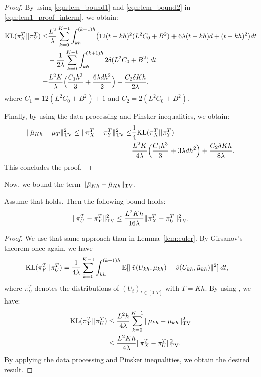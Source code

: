 \begin{proof}
By using \eqref{eqn:lem_bound1} and \eqref{eqn:lem_bound2} in \eqref{eqn:lem1_proof_interm}, we obtain:
\begin{align}
\nonumber \textnormal{KL} (\pi_{X}^T || \pi_{Y}^T) \leq& \frac{L^2}{\lambda} \sum_{k=0}^{K-1} \int_{kh}^{(k+1)h} \bigl(12(t-kh)^2 (L^2 C_0 + B^2) + 6\lambda (t-kh)d +(t-kh)^2 \bigr) dt\\
&+  \frac1{2 \lambda} \sum_{k=0}^{K-1} \int_{kh}^{(k+1)h} 2 \delta(L^2 C_0 + B^2) \> dt \\
=& \frac{L^2 K}{\lambda} \Bigl( \frac{C_1 h^3}{3} + \frac{6 \lambda d h^2}{2} \Bigr) + \frac{C_2 \delta K h}{2\lambda},
\end{align}
where $C_1 = 12(L^2 C_0 + B^2)+1$ and $C_2 = 2 (L^2 C_0 + B^2)$.

Finally, by using the data processing and Pinsker inequalities, we obtain:
\begin{align}
\| \hat{\mu}_{Kh} - \mu_{T} \|_{\textnormal{TV}}^2 \leq \| \pi_{X}^T - \pi_{Y}^T \|_{\textnormal{TV}}^2 \leq& \frac1{4} \textnormal{KL} (\pi_{X}^T || \pi_{Y}^T) \\
=& \frac{L^2 K}{4\lambda} \Bigl( \frac{C_1 h^3}{3} + 3 \lambda d h^2 \Bigr) + \frac{C_2 \delta K h}{8\lambda}.
\end{align}
This concludes the proof.
%
\end{proof}


Now, we bound the term $\| \bar{\mu}_{Kh} - \hat{\mu}_{Kh} \|_{\textnormal{TV}}$.
\begin{lemma}
\label{lem:euler2}
Assume that  holds. Then the following bound holds:
\begin{align}
\| \pi_{U}^T - \pi_{Y}^T \|_{\textnormal{TV}}^2  \leq \frac{L^2 K h}{16 \lambda}  \|\pi_{X}^T - \pi_{U}^T \|_{\textnormal{TV}}^2 .
\end{align}
\end{lemma}
%
\begin{proof}
We use that same approach than in Lemma~\ref{lem:euler}. By Girsanov's theorem once again, we have
\begin{align}
\textnormal{KL} (\pi_{Y}^T || \pi_{U}^T) &= \frac1{4 \lambda} \sum_{k=0}^{K-1} \int_{kh}^{(k+1)h} \mathbb{E}[ \|\hat{v}(U_{kh}, \mu_{kh}) - \hat{v}(U_{kh},\bar{\mu}_{kh}) \|^2 ] \> dt,
\end{align}
where $\pi_U^T$ denotes the distributions of $(U_t)_{t \in [0,T]}$ with $T = Kh$. By using , we have:
\begin{align}
\textnormal{KL} (\pi_{Y}^T || \pi_{U}^T) &\leq \frac{L^2 h}{4 \lambda} \sum_{k=0}^{K-1} \|\mu_{kh} - \bar{\mu}_{kh} \|_{\textnormal{TV}}^2   \\
&\leq \frac{L^2 K h}{4 \lambda}  \|\pi_{X}^T - \pi_{U}^T \|_{\textnormal{TV}}^2  .
\end{align}
By applying the data processing and Pinsker inequalities, we obtain the desired result.
\end{proof}

